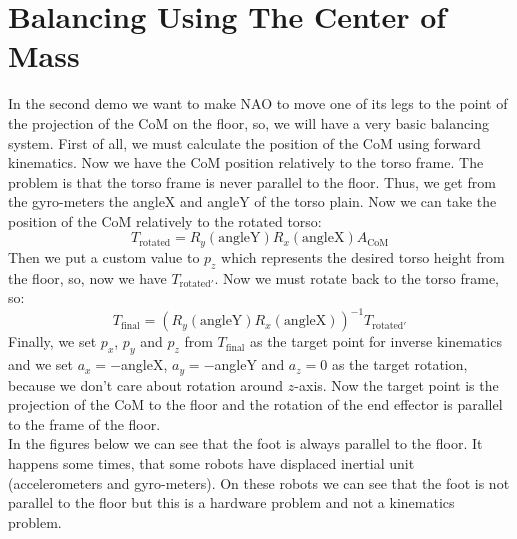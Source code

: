 \section{Balancing Using The Center of Mass}
In the second demo we want to make NAO to move one of its legs to the point of the projection of the CoM on the floor, so, we will have a very basic balancing system. First of all, we must calculate the position of the CoM using forward kinematics. Now we have the CoM position relatively to the torso frame. The problem is that the torso frame is never parallel to the floor. Thus, we get from the gyro-meters the angleX and angleY of the torso plain. Now we can take the position of the CoM relatively to the rotated torso:
\[
	T_{\text{rotated}} = R_y(\text{angleY})R_x(\text{angleX})A_{\text{CoM}}
\]
Then we put a custom value to \(p_z\) which represents the desired torso height from the floor, so, now we have \(T_{\text{rotated}'}\). Now we must rotate back to the torso frame, so:
\[
	T_{\text{final}} = \left(R_y(\text{angleY})R_x(\text{angleX})\right)^{-1}T_{\text{rotated}'}
\]
Finally, we set  \(p_x\), \(p_y\) and \(p_z\) from \(T_{\text{final}}\) as the target point for inverse kinematics and we set \(a_x = -\)angleX, \(a_y = -\)angleY and \(a_z = 0\) as the target rotation, because we don't care about rotation around \(z\)-axis. Now the target point is the projection of the CoM to the floor and the rotation of the end effector is parallel to the frame of the floor.\\
In the figures below we can see that the foot is always parallel to the floor. It happens some times, that some robots have displaced inertial unit (accelerometers and gyro-meters). On these robots we can see that the foot is not parallel to the floor but this is a hardware problem and not a kinematics problem.
